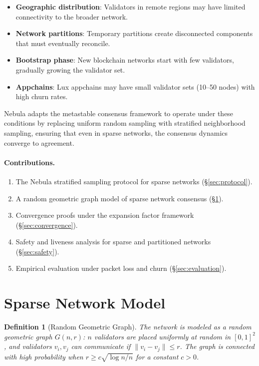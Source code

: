\documentclass[11pt,a4paper]{article}
\newtheorem{definition}{Definition}[section]
\begin{document}
\begin{itemize}[nosep]
\item \textbf{Geographic distribution}: Validators in remote regions may have limited
connectivity to the broader network.
\item \textbf{Network partitions}: Temporary partitions create disconnected components
that must eventually reconcile.
\item \textbf{Bootstrap phase}: New blockchain networks start with few validators,
gradually growing the validator set.
\item \textbf{Appchains}: Lux appchains may have small validator sets (10--50 nodes)
with high churn rates.
\end{itemize}

Nebula adapts the metastable consensus framework to operate under these conditions by
replacing uniform random sampling with stratified neighborhood sampling, ensuring that
even in sparse networks, the consensus dynamics converge to agreement.

\paragraph{Contributions.}
\begin{enumerate}[nosep]
\item The Nebula stratified sampling protocol for sparse networks (\S\ref{sec:protocol}).
\item A random geometric graph model of sparse network consensus (\S\ref{sec:model}).
\item Convergence proofs under the expansion factor framework (\S\ref{sec:convergence}).
\item Safety and liveness analysis for sparse and partitioned networks (\S\ref{sec:safety}).
\item Empirical evaluation under packet loss and churn (\S\ref{sec:evaluation}).
\end{enumerate}

\section{Sparse Network Model}
\label{sec:model}

\begin{definition}[Random Geometric Graph]
The network is modeled as a random geometric graph $G(n, r)$: $n$ validators are
placed uniformly at random in $[0, 1]^2$, and validators $v_i, v_j$ can communicate
if $\|v_i - v_j\| \leq r$. The graph is connected with high probability when
$r \geq c\sqrt{\log n / n}$ for a constant $c > 0$.
\end{definition}
\end{document}
